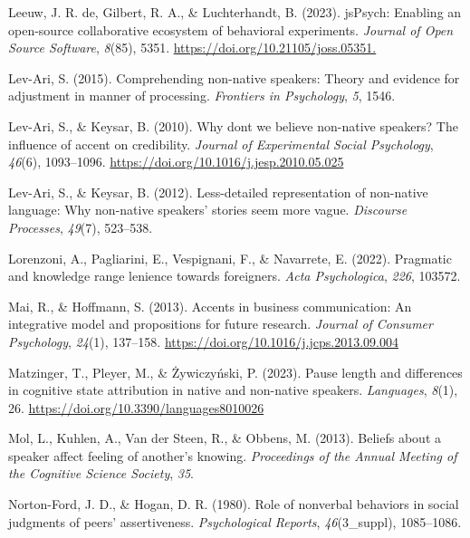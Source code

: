 \documentclass[
  man,floatsintext]{apa7}
\newlength{\cslhangindent}
\newlength{\cslentryspacingunit} %
\newenvironment{CSLReferences}[2] %
 {%
  \setlength{\parindent}{0pt}
  \ifodd #1
  \let\oldpar\par
  \def\par{\hangindent=\cslhangindent\oldpar}
  \fi
  \setlength{\parskip}{#2\cslentryspacingunit}
 }%
 {}
\begin{document}
\begin{CSLReferences}{1}{0}
\leavevmode{}%
Leeuw, J. R. de, Gilbert, R. A., \& Luchterhandt, B. (2023). jsPsych: Enabling an open-source collaborative ecosystem of behavioral experiments. \emph{Journal of Open Source Software}, \emph{8}(85), 5351. \url{https://doi.org/10.21105/joss.05351.}

\leavevmode{}%
Lev-Ari, S. (2015). Comprehending non-native speakers: Theory and evidence for adjustment in manner of processing. \emph{Frontiers in Psychology}, \emph{5}, 1546.

\leavevmode{}%
Lev-Ari, S., \& Keysar, B. (2010). Why don{\textquotesingle}t we believe non-native speakers? {The influence of accent on credibility}. \emph{Journal of Experimental Social Psychology}, \emph{46}(6), 1093--1096. \url{https://doi.org/10.1016/j.jesp.2010.05.025}

\leavevmode{}%
Lev-Ari, S., \& Keysar, B. (2012). Less-detailed representation of non-native language: Why non-native speakers' stories seem more vague. \emph{Discourse Processes}, \emph{49}(7), 523--538.

\leavevmode{}%
Lorenzoni, A., Pagliarini, E., Vespignani, F., \& Navarrete, E. (2022). Pragmatic and knowledge range lenience towards foreigners. \emph{Acta Psychologica}, \emph{226}, 103572.

\leavevmode{}%
Mai, R., \& Hoffmann, S. (2013). Accents in business communication: An integrative model and propositions for future research. \emph{Journal of Consumer Psychology}, \emph{24}(1), 137--158. \url{https://doi.org/10.1016/j.jcps.2013.09.004}

\leavevmode{}%
Matzinger, T., Pleyer, M., \& Żywiczyński, P. (2023). Pause length and differences in cognitive state attribution in native and non-native speakers. \emph{Languages}, \emph{8}(1), 26. \url{https://doi.org/10.3390/languages8010026}

\leavevmode{}%
Mol, L., Kuhlen, A., Van der Steen, R., \& Obbens, M. (2013). Beliefs about a speaker affect feeling of another's knowing. \emph{Proceedings of the Annual Meeting of the Cognitive Science Society}, \emph{35}.

\leavevmode{}%
Norton-Ford, J. D., \& Hogan, D. R. (1980). Role of nonverbal behaviors in social judgments of peers' assertiveness. \emph{Psychological Reports}, \emph{46}(3\_suppl), 1085--1086.


\end{CSLReferences}
\end{document}
